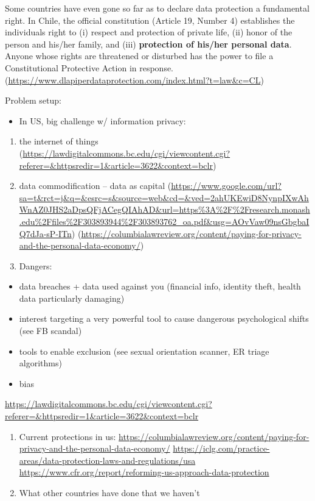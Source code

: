 \documentclass[water,article,submit,moreauthors,pdftex]{mdpi}
\providecommand{\tightlist}{%
  \setlength{\itemsep}{0pt}\setlength{\parskip}{4pt}}
\begin{document}
Some countries have even gone so far as to declare data protection a
fundamental right. In Chile, the official constitution (Article 19,
Number 4) establishes the individuals right to (i) respect and
protection of private life, (ii) honor of the person and his/her family,
and (iii) \textbf{protection of his/her personal data}. Anyone whose
rights are threatened or disturbed has the power to file a
Constitutional Protective Action in response.
(\url{https://www.dlapiperdataprotection.com/index.html?t=law\&c=CL})

Problem setup:

\begin{itemize}
\tightlist
\item
  In US, big challenge w/ information privacy:
\end{itemize}

\begin{enumerate}
\def\labelenumi{\arabic{enumi}.}
\item
  the internet of things
  (\url{https://lawdigitalcommons.bc.edu/cgi/viewcontent.cgi?referer=\&httpsredir=1\&article=3622\&context=bclr})
\item
  data commodification -- data as capital
  (\url{https://www.google.com/url?sa=t\&rct=j\&q=\&esrc=s\&source=web\&cd=\&ved=2ahUKEwiD8NynpIXwAhWnAZ0JHS2aDpsQFjACegQIAhAD\&url=https\%3A\%2F\%2Fresearch.monash.edu\%2Ffiles\%2F303893944\%2F303893762_oa.pdf\&usg=AOvVaw09nsGbgbaIQ7dJa-sP-ITn})
  (\url{https://columbialawreview.org/content/paying-for-privacy-and-the-personal-data-economy/})
\item
  Dangers:
\end{enumerate}

\begin{itemize}
\tightlist
\item
  data breaches + data used against you (financial info, identity theft,
  health data particularly damaging)
\item
  interest targeting a very powerful tool to cause dangerous
  psychological shifts (see FB scandal)
\item
  tools to enable exclusion (see sexual orientation scanner, ER triage
  algorithms)
\item
  bias
\end{itemize}

\url{https://lawdigitalcommons.bc.edu/cgi/viewcontent.cgi?referer=\&httpsredir=1\&article=3622\&context=bclr}

\begin{enumerate}
\def\labelenumi{\arabic{enumi}.}
\setcounter{enumi}{3}
\item
  Current protections in us:
  \url{https://columbialawreview.org/content/paying-for-privacy-and-the-personal-data-economy/}
  \url{https://iclg.com/practice-areas/data-protection-laws-and-regulations/usa}
  \url{https://www.cfr.org/report/reforming-us-approach-data-protection}
\item
  What other countries have done that we haven't
\end{enumerate}
\end{document}
